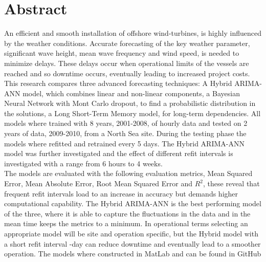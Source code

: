 \chapter*{Abstract}

An efficient and smooth installation of offshore wind-turbines, is highly influenced by the weather conditions. Accurate forecasting of the key weather parameter, significant wave height, mean wave frequency and  wind speed, is needed to minimize delays. These delays occur when operational limits of the vessels are reached and so downtime occurs, eventually leading to increased project costs. This research compares three advanced forecasting techniques: A Hybrid ARIMA-ANN model, which combines linear and non-linear components, a Bayesian Neural Network with Mont Carlo dropout, to find a probabilistic distribution in the solutions, a Long Short-Term Memory model, for long-term dependencies. All models where trained with 8 years, 2001-2008, of hourly data and tested on 2 years of data, 2009-2010, from a North Sea site. During the testing phase the models where refitted and retrained every 5 days. The Hybrid ARIMA-ANN model was further investigated and the effect of different refit intervals is investigated with a range from 6 hours to 4 weeks.\\

\noindent The models are evaluated with the following evaluation metrics, Mean Squared Error, Mean Absolute Error, Root Mean Squared Error and $R^2$, these reveal that frequent refit intervals load to an increase in accuracy but demands higher computational capability. The Hybrid ARIMA-ANN is the best performing model of the three, where it is able to capture the fluctuations in the data and in the mean time keeps the metrics to a minimum. In operational terms selecting an appropriate model will be site and operation specific, but the Hybrid model with a short refit interval -day can reduce downtime and eventually lead to a smoother operation. The models where constructed in MatLab and can be found in GitHub 
